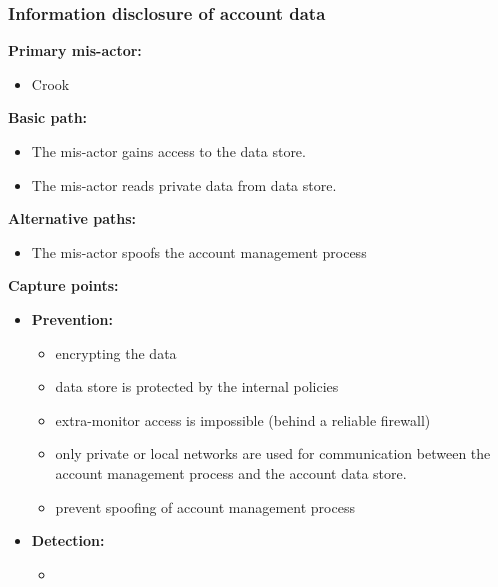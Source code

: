 \documentclass[a4paper,11pt]{report}
\begin{document}
\subsubsection{Information disclosure of account data}
\textbf{Primary mis-actor:}
\begin{itemize}
\item Crook
\end{itemize}
\textbf{Basic path:}
\begin{itemize}
\item The mis-actor gains access to the data store.
\item The mis-actor reads private data from data store.
\end{itemize}
\textbf{Alternative paths:}
\begin{itemize}
\item The mis-actor spoofs the account management process
\end{itemize}
\textbf{Capture points:}
\begin{itemize}
\item \textbf{Prevention:}
\begin{itemize}
\item encrypting the data 
\item data store is protected by the internal policies
\item extra-monitor access is impossible (behind a reliable firewall)
\item only private or local networks are used for communication between the account management process 
and the account data store.
\item prevent spoofing of account management process
\end{itemize}
\item \textbf{Detection:}
\begin{itemize}
\item 
\end{itemize}
\end{itemize}
\end{document}
